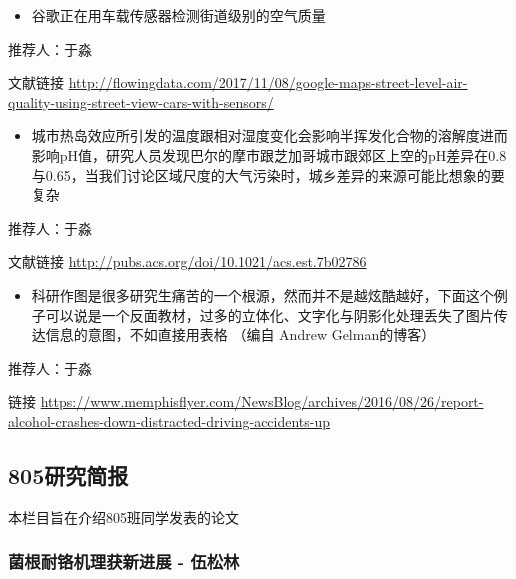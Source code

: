 \documentclass[
]{book}
\providecommand{\tightlist}{%
  \setlength{\itemsep}{0pt}\setlength{\parskip}{0pt}}
\begin{document}
\begin{itemize}
\tightlist
\item
  谷歌正在用车载传感器检测街道级别的空气质量
\end{itemize}

推荐人：于淼

文献链接 \url{http://flowingdata.com/2017/11/08/google-maps-street-level-air-quality-using-street-view-cars-with-sensors/}

\begin{itemize}
\tightlist
\item
  城市热岛效应所引发的温度跟相对湿度变化会影响半挥发化合物的溶解度进而影响pH值，研究人员发现巴尔的摩市跟芝加哥城市跟郊区上空的pH差异在0.8与0.65，当我们讨论区域尺度的大气污染时，城乡差异的来源可能比想象的要复杂
\end{itemize}

推荐人：于淼

文献链接 \url{http://pubs.acs.org/doi/10.1021/acs.est.7b02786}

\begin{itemize}
\tightlist
\item
  科研作图是很多研究生痛苦的一个根源，然而并不是越炫酷越好，下面这个例子可以说是一个反面教材，过多的立体化、文字化与阴影化处理丢失了图片传达信息的意图，不如直接用表格 （编自 Andrew Gelman的博客）
\end{itemize}

推荐人：于淼

链接 \url{https://www.memphisflyer.com/NewsBlog/archives/2016/08/26/report-alcohol-crashes-down-distracted-driving-accidents-up}

\hypertarget{ux7814ux7a76ux7b80ux62a5}{%
\subsection*{805研究简报}\label{ux7814ux7a76ux7b80ux62a5}}

本栏目旨在介绍805班同学发表的论文

\hypertarget{ux83ccux6839ux8010ux94ecux673aux7406ux83b7ux65b0ux8fdbux5c55---ux4f0dux677eux6797}{%
\subsubsection*{菌根耐铬机理获新进展 - 伍松林}\label{ux83ccux6839ux8010ux94ecux673aux7406ux83b7ux65b0ux8fdbux5c55---ux4f0dux677eux6797}}
\end{document}
